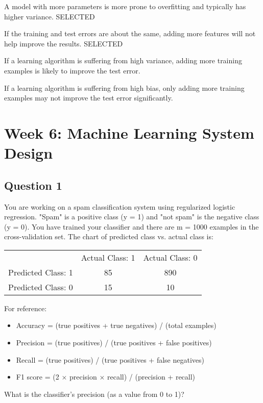 \documentclass[11pt]{article} %
\begin{document}
A model with more parameters is more prone to overfitting and typically has higher variance. SELECTED

If the training and test errors are about the same, adding more features will not help improve the results. SELECTED

If a learning algorithm is suffering from high variance, adding more training examples is likely to improve the test error.

If a learning algorithm is suffering from high bias, only adding more training examples may not improve the test error significantly.

\newpage
\section*{Week 6: Machine Learning System Design}

\subsection*{Question 1} 
You are working on a spam classification system using regularized logistic regression. "Spam" is a positive class (y = 1) and "not spam" is the negative class (y = 0). You have trained your classifier and there are m = 1000 examples in the cross-validation set. The chart of predicted class vs. actual class is:


\begin{tabular}{ccc}
& Actual Class: 1	& Actual Class: 0 \\
Predicted Class: 1 &	85&	890 \\ 
Predicted Class: 0 &	15&	10\\
\end{tabular} 

\begin{framed}
For reference:

\begin{itemize}
	\item Accuracy = (true positives + true negatives) / (total examples)
	\item Precision = (true positives) / (true positives + false positives)
	\item Recall = (true positives) / (true positives + false negatives)
	\item F1 score = (2 $\times$ precision $\times$ recall) / (precision + recall)
\end{itemize}

\end{framed}
What is the classifier's precision (as a value from 0 to 1)?
\end{document}
